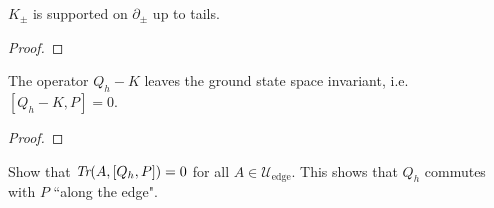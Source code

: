 \documentclass[12pt, letterpaper]{article}
\begin{document}
\begin{lemma}
$K_\pm$ is supported on $\partial_\pm$ up to tails.
\label{SupportOfK}
\end{lemma}
\begin{proof}

\end{proof}

\begin{proposition}
The operator $Q_h-K$ leaves the ground state space invariant, i.e. $[Q_h-K, P] = 0$.
\end{proposition}
\begin{proof}

\end{proof}


\begin{lemma}
Show that $\emph{Tr}(A,[Q_h,P])=0$ for all $A \in \mathcal{U}_{\text{edge}}$. This shows that $Q_h$ commutes with $P$ ``along the edge".
\label{lemma:[Q,P]=0}
\end{lemma}
\end{document}
